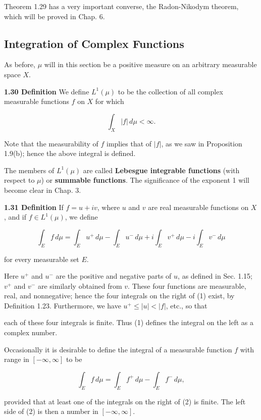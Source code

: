 \documentclass[11pt]{article}
\begin{document}
Theorem 1.29 has a very important converse, the Radon-Nikodym theorem, which will be proved in Chap. 6.
\subsection{Integration of Complex Functions}
\label{sec:orgadab7eb}

As before, \(\mu\) will in this section be a positive measure on an arbitrary measurable space \(X\).

\label{org966c8f9}
\textbf{\textbf{1.30 Definition}} We define \(L^{1}(\mu)\) to be the collection of all complex measurable functions \(f\) on \(X\) for which

\[
\int_{X} |f| \, d\mu < \infty.
\]

Note that the measurability of \(f\) implies that of \(|f|\), as we saw in Proposition 1.9(b); hence the above integral is defined.

The members of \(L^{1}(\mu)\) are called \textbf{\textbf{Lebesgue integrable functions}} (with respect to \(\mu\)) or \textbf{\textbf{summable functions}}. The significance of the exponent 1 will become clear in Chap. 3.

\label{orgecb146a}
\textbf{\textbf{1.31 Definition}} If \(f = u + iv\), where \(u\) and \(v\) are real measurable functions on \(X\), and if \(f \in L^{1}(\mu)\), we define

\[
\int_{E} f \, d\mu = \int_{E} u^{+} \, d\mu - \int_{E} u^{-} \, d\mu + i \int_{E} v^{+} \, d\mu - i \int_{E} v^{-} \, d\mu \tag{1}
\]

for every measurable set \(E\).

Here \(u^{ + }\) and \(u^{ - }\) are the positive and negative parts of \(u\), as defined in Sec. 1.15; \(v^{ + }\) and \(v^{ - }\) are similarly obtained from \(v\). These four functions are measurable, real, and nonnegative; hence the four integrals on the right of (1) exist, by Definition 1.23. Furthermore, we have \(u^{ + } \leq |u| < |f|\), etc., so that

each of these four integrals is finite. Thus (1) defines the integral on the left as a complex number.

Occasionally it is desirable to define the integral of a measurable function \(f\) with range in \([-\infty, \infty]\) to be

\[
\int_{E} f \, d\mu = \int_{E} f^{+} \, d\mu - \int_{E} f^{-} \, d\mu,\tag{2}
\]


provided that at least one of the integrals on the right of (2) is finite. The left side of (2) is then a number in \([-\infty, \infty]\).
\end{document}
